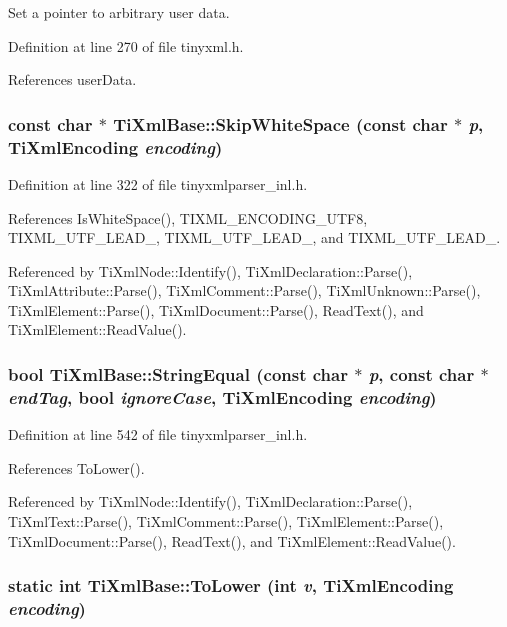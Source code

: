 Set a pointer to arbitrary user data. 

Definition at line 270 of file tinyxml.h.

References userData.\hypertarget{class_ti_xml_base_ac0c3d66d8a9e6996a1fa016275e16875}{
\subsubsection[{SkipWhiteSpace}]{\setlength{\rightskip}{0pt plus 5cm}const char $\ast$ TiXmlBase::SkipWhiteSpace (const char $\ast$ {\em p}, \/  {\bf TiXmlEncoding} {\em encoding})}}
\label{class_ti_xml_base_ac0c3d66d8a9e6996a1fa016275e16875}


Definition at line 322 of file tinyxmlparser\_\-inl.h.

References IsWhiteSpace(), TIXML\_\-ENCODING\_\-UTF8, TIXML\_\-UTF\_\-LEAD\_, TIXML\_\-UTF\_\-LEAD\_, and TIXML\_\-UTF\_\-LEAD\_.

Referenced by TiXmlNode::Identify(), TiXmlDeclaration::Parse(), TiXmlAttribute::Parse(), TiXmlComment::Parse(), TiXmlUnknown::Parse(), TiXmlElement::Parse(), TiXmlDocument::Parse(), ReadText(), and TiXmlElement::ReadValue().\hypertarget{class_ti_xml_base_a51631e6986179558b9e5850723ed165a}{
\subsubsection[{StringEqual}]{\setlength{\rightskip}{0pt plus 5cm}bool TiXmlBase::StringEqual (const char $\ast$ {\em p}, \/  const char $\ast$ {\em endTag}, \/  bool {\em ignoreCase}, \/  {\bf TiXmlEncoding} {\em encoding})}}
\label{class_ti_xml_base_a51631e6986179558b9e5850723ed165a}


Definition at line 542 of file tinyxmlparser\_\-inl.h.

References ToLower().

Referenced by TiXmlNode::Identify(), TiXmlDeclaration::Parse(), TiXmlText::Parse(), TiXmlComment::Parse(), TiXmlElement::Parse(), TiXmlDocument::Parse(), ReadText(), and TiXmlElement::ReadValue().\hypertarget{class_ti_xml_base_a799f17405a86a5c2029618e85f11a097}{
\subsubsection[{ToLower}]{\setlength{\rightskip}{0pt plus 5cm}static int TiXmlBase::ToLower (int {\em v}, \/  {\bf TiXmlEncoding} {\em encoding})}}
\label{class_ti_xml_base_a799f17405a86a5c2029618e85f11a097}


